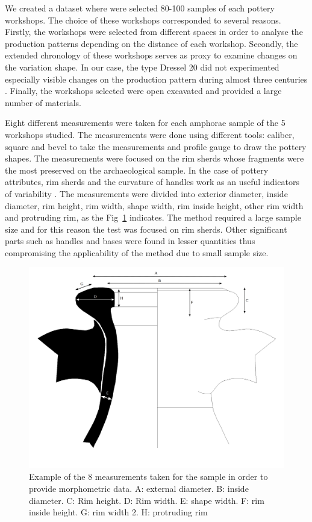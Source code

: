 \documentclass[review]{elsarticle}
\begin{document}
We created a dataset where were selected 80-100 samples of each pottery workshops. The choice of these workshops corresponded to several reasons. Firstly, the workshops were selected from different spaces in order to analyse the production patterns depending on the distance of each workshop. Secondly, the extended chronology of these workshops serves as proxy to examine changes on the variation shape. In our case, the type Dressel 20 did not experimented especially visible changes on the production pattern during almost three centuries \citep{berni_dressel_2016}. Finally, the workshops selected were open excavated and provided a large number of materials.   

Eight different measurements were taken for each amphorae sample of the 5 workshops studied. The measurements were done using different tools: caliber, square and bevel to take the measurements and profile gauge to draw the pottery shapes. The measurements were focused on the rim sherds whose fragments were the most preserved on the archaeological sample. In the case of pottery attributes, rim sherds and the curvature of handles work as an useful indicators of variability \citep{berni_millet_epigrafianforica_2008}.
The measurements were divided into exterior diameter, inside diameter, rim height, rim width, shape width, rim inside height, other rim width and protruding rim, as the Fig~\ref{mesures} indicates. The method required a large sample size and for this reason the test was focused on rim sherds. Other significant parts such as handles and bases were found in lesser quantities thus compromising the applicability of the method due to small sample size.

\begin{figure}[htp]
	\centering
\includegraphics[scale=0.10]{mesures.png}
\caption{Example of the 8 measurements taken for the sample in order to provide morphometric data. A: external diameter. B: inside diameter. C: Rim height. D: Rim width. E: shape width. F: rim inside height. G: rim width 2. H: protruding rim}
\label{mesures}
\end{figure} 
\end{document}
